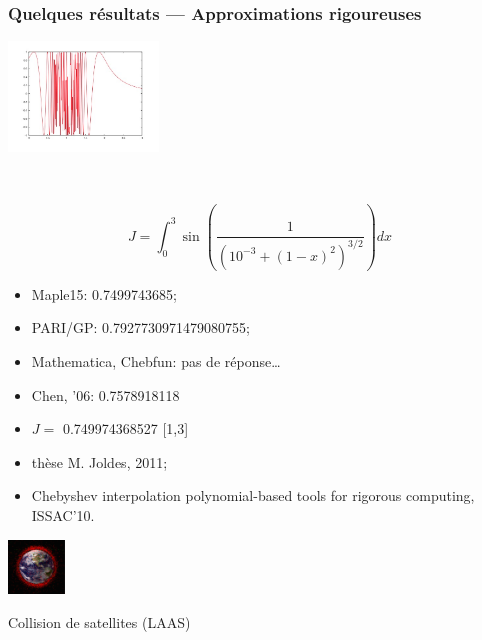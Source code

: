 \documentclass[mathsans]{beamer}
\begin{document}
\begin{frame}
\frametitle{Quelques résultats — Approximations rigoureuses}
\begin{minipage}{4.5cm}
\includegraphics[width=4cm]{Figures/CourbeMioara.jpg}
\end{minipage}~~~
\begin{minipage}{4cm}
\[
J = \int_0^3 \sin \left( \frac{1}{\left(10^{-3} + (1-x)^2\right)^{3/2}} \right) dx
\]
\end{minipage}

\begin{minipage}{6cm}
\begin{itemize}
   \item Maple15: 0.7499743685;
   \item PARI/GP: 0.7927730971479080755;
   \item Mathematica, Chebfun: pas de réponse\ldots{}
   \item Chen, ’06: 0.7578918118
   \item \alert{$J =$ 0.749974368527 [1,3]}
\end{itemize}
\end{minipage}
\begin{minipage}{5.4cm}
\begin{itemize}
    \item thèse M. Joldes, 2011;
    \item {Chebyshev interpolation polynomial-based tools for rigorous computing}, ISSAC'10.
\end{itemize}
\begin{minipage}{1.8cm}
\includegraphics[width=1.5cm]{Figures/satellites.pdf}
\end{minipage}
\begin{minipage}{3.1cm}
\begin{tiny}
Collision de satellites (LAAS)
\end{tiny}
\end{minipage}
\end{minipage}
\end{frame}
\end{document}
